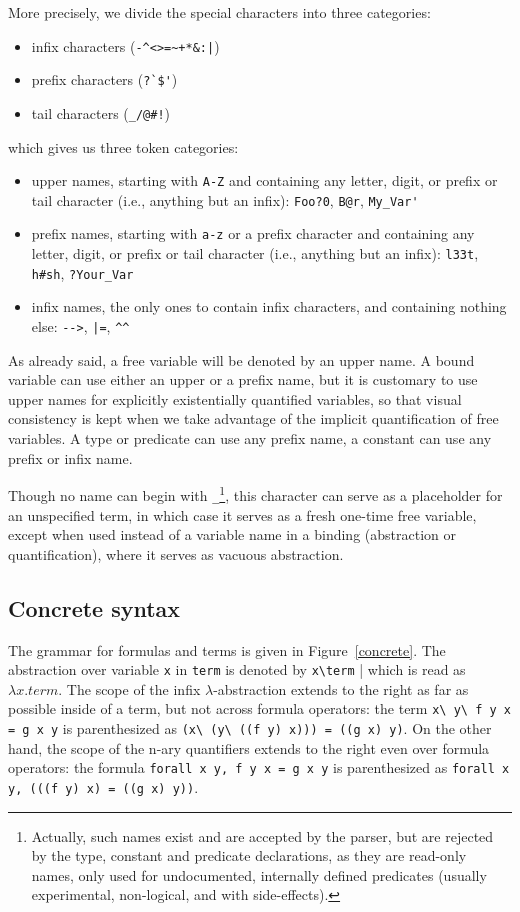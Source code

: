 \documentclass{article}
\begin{document}
More precisely, we divide the special characters into three categories:
\begin{itemize}
  \item infix characters (\verb.-^<>=~+*&:|.)
  \item prefix characters (\verb.?`$'.)
  \item tail characters (\verb._/@#!.)
\end{itemize}
which gives us three token categories:
\begin{itemize}
  \item upper names, starting with \verb.A-Z. and containing any letter,
    digit, or prefix or tail character (i.e., anything but an infix):
    \verb.Foo?0., \verb.B@r., \verb.My_Var'.
  \item prefix names, starting with \verb.a-z. or a prefix character and
    containing any letter, digit, or prefix or tail character (i.e.,
    anything but an infix): \verb.l33t., \verb.h#sh., \verb.?Your_Var.
  \item infix names, the only ones to contain infix characters, and
    containing nothing else: \verb.-->., \verb.|=., \verb.^^.
\end{itemize}
As already said, a free variable will be denoted by an upper name. A
bound variable can use either an upper or a prefix name, but it is
customary to use upper names for explicitly existentially quantified
variables, so that visual consistency is kept when we take advantage of
the implicit quantification of free variables. A type or predicate can
use any prefix name, a constant can use any prefix or infix name.

Though no name can begin with \verb._.\footnote{Actually, such names
exist and are accepted by the parser, but are rejected by the type,
constant and predicate declarations, as they are read-only names, only
used for undocumented, internally defined predicates (usually
experimental, non-logical, and with side-effects).}, this character can
serve as a placeholder for an unspecified term, in which case it serves
as a fresh one-time free variable, except when used instead of a
variable name in a binding (abstraction or quantification), where it
serves as vacuous abstraction.

\subsection{Concrete syntax}

The grammar for formulas and terms is given in Figure~\ref{concrete}.
The abstraction over variable \verb.x. in \verb.term. is denoted by
\verb.x\term. | which is read as $\lambda x. term$. The scope of the
infix $\lambda$-abstraction extends to the right as far as possible
inside of a term, but not across formula operators: the term
\verb.x\ y\ f y x = g x y. is parenthesized as
\verb.(x\ (y\ ((f y) x))) = ((g x) y)..
On the other hand, the scope of the n-ary quantifiers extends to the
right even over formula operators: the formula
{\tt forall x y, f y x = g x y} is parenthesized as
{\tt forall x y, (((f y) x) = ((g x) y))}.
\end{document}
